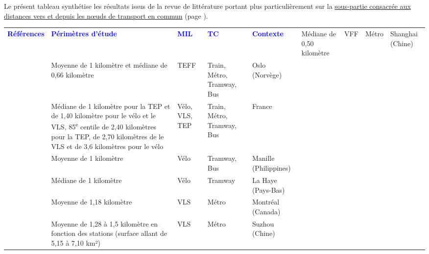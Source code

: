 Le présent tableau synthétise les résultats issus de la revue de littérature portant plus particulièrement sur la \hyperref[Distances vers et depuis les nœuds de transport en commun]{sous-partie consacrée aux distances vers et depuis les nœuds de transport en commun} (page \pageref{Distances vers et depuis les nœuds de transport en commun}).\par

        \begin{longtable}{p{3cm}p{4cm}p{1.5cm}p{1.8cm}p{2.3cm}}
        \hline
        \textcolor{blue}{\textbf{Références}} & \textcolor{blue}{\textbf{Périmètres d'étude}} & \textcolor{blue}{\textbf{MIL}} & \textcolor{blue}{\textbf{TC}} & \textcolor{blue}{\textbf{Contexte}}
        \hline
        \endhead
    \small{\textcite{zhang_bicyclemetro_2019}} & \small{Médiane de 0,50 kilomètre} & \small{VFF} & \small{Métro} & \small{Shanghai (Chine)}\\
    \small{\textcite{fearnley_patterns_2020}} & \small{Moyenne de 1 kilomètre et médiane de 0,66 kilomètre} & \small{TEFF} & \small{Train, Métro, Tramway, Bus} & \small{Oslo (Norvège)}\\
    \small{\textcite{rabaud_quand_2022}} & \small{Médiane de 1 kilomètre pour la TEP et de 1,40 kilomètre pour le vélo et le VLS, 85\textsuperscript{e} centile de 2,40 kilomètres pour la TEP, de 2,70 kilomètres de le VLS et de 3,6 kilomètres pour le vélo} & \small{Vélo, VLS, TEP} & \small{Train, Métro, Tramway, Bus} & \small{France}\\
    \small{\textcite{fillone_i_2018}} & \small{Moyenne de 1 kilomètre} & \small{Vélo} & \small{Tramway, Bus} & \small{Manille (Philippines)}\\
    \small{\textcite{rijsman_walking_2019}} & \small{Médiane de 1 kilomètre} & \small{Vélo} & \small{Tramway} & \small{La Haye (Pays-Bas)}\\
    \small{\textcite{tarpin-pitre_typology_2020}} & \small{Moyenne de 1,18 kilomètre} & \small{VLS} & \small{Métro} & \small{Montréal (Canada)}\\
    \small{\textcite{ma_measuring_2018}} & \small{Moyenne de 1,28 à 1,5 kilomètre en fonction des stations (surface allant de 5,15 à 7,10 km²)} & \small{VLS} & \small{Métro} & \small{Suzhou (Chine)}\\

\end{longtable}
